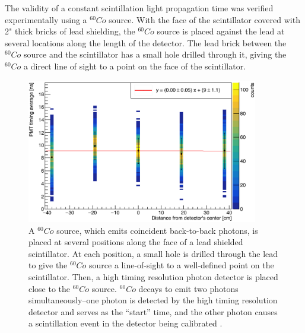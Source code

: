 The validity of a constant scintillation light propagation time was verified experimentally using a $^{60}Co$ source. With the face of the scintillator covered with 2" thick bricks of lead shielding, the $^{60}Co$ source is placed against the lead at several locations along the length of the detector. The lead brick between the $^{60}Co$ source and the scintillator has a small hole drilled through it, giving the $^{60}Co$ a direct line of sight to a point on the face of the scintillator.  

\begin{figure}
    \centering
    \includegraphics[width = 0.9\textwidth]{Content/Methods/CO60Validation.png}
    \caption{A $^{60}Co$ source, which emits coincident back-to-back photons, is placed at several positions along the face of a lead shielded scintillator. At each position, a small hole is drilled through the lead to give the $^{60}Co$ source a line-of-sight to a well-defined point on the scintillator. Then, a high timing resolution photon detector is placed close to the $^{60}Co$ source. $^{60}Co$ decays to emit two photons simultaneously--one photon is detected by the high timing resolution detector and serves as the ``start'' time, and the other photon causes a scintillation event in the detector being calibrated .}
    \label{fig:Co60Validation}
\end{figure}

